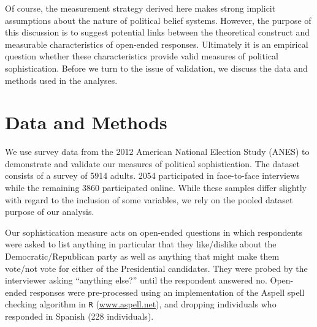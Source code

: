 \documentclass[12pt]{article}
\begin{document}
Of course, the measurement strategy derived here makes strong implicit assumptions about the nature of political belief systems. However, the purpose of this discussion is to suggest potential links between the theoretical construct and measurable characteristics of open-ended responses. Ultimately it is an empirical question whether these characteristics provide valid measures of political sophistication. Before we turn to the issue of validation, we discuss the data and methods used in the analyses.



\section{Data and Methods}

We use survey data from the 2012 American National Election Study (ANES) to demonstrate and validate our measures of political sophistication. The dataset consists of a survey of 5914 adults. 2054 participated in face-to-face interviews while the remaining 3860 participated online. While these samples differ slightly with regard to the inclusion of some variables, we rely on the pooled dataset purpose of our analysis.

Our sophistication measure acts on open-ended questions in which respondents were asked to list anything in particular that they like/dislike about the Democratic/Republican party as well as anything that might make them vote/not vote for either of the Presidential candidates. They were probed by the interviewer asking ``anything else?'' until the respondent answered no. Open-ended responses were pre-processed using an implementation of the Aspell spell checking algorithm in \texttt{R} (\url{www.aspell.net}), and dropping individuals who responded in Spanish (228 individuals). 
\end{document}
